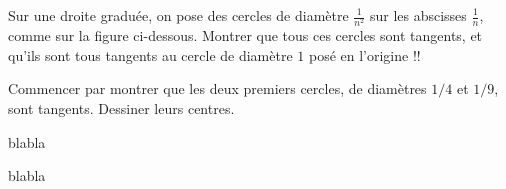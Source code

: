 \begin{exo}
Sur une droite graduée, on \og pose\fg{} des cercles de diamètre $\frac{1}{n^2}$ sur les abscisses $\frac{1}{n}$, comme sur la figure ci-dessous. Montrer que tous ces cercles sont tangents, et qu'ils sont tous tangents au cercle de diamètre $1$ posé en l'origine !!
\begin{center}
\end{center}
\begin{hint}
Commencer par montrer que les deux premiers cercles, de diamètres $1/4$ et $1/9$, sont tangents. Dessiner leurs centres.
\end{hint}
\end{exo}

\begin{exo}
blabla
\begin{center}
\begin{tikzpicture}
\end{tikzpicture}
\end{center}
\end{exo}


\begin{exo}
blabla
\begin{center}
\begin{tikzpicture}
\end{tikzpicture}
\end{center}
\end{exo}




\indications
\correction



